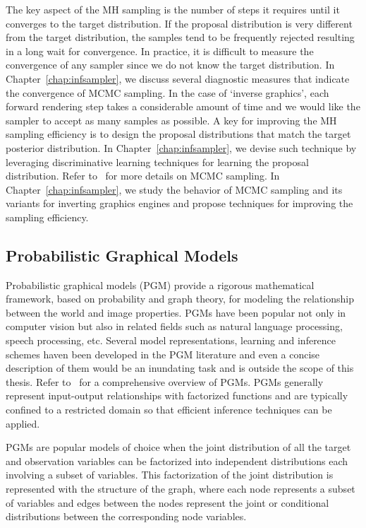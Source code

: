 The key aspect of the MH sampling is the number of steps it requires until
it converges to the target distribution. If the proposal distribution is very
different from the target distribution, the samples tend to be frequently rejected
resulting in a long wait for convergence. In practice, it is difficult to
measure the convergence of any sampler since we do not know the target
distribution. In Chapter~\ref{chap:infsampler}, we discuss several diagnostic
measures that indicate the convergence of MCMC sampling. In the case of
`inverse graphics', each forward rendering step takes a considerable amount of time and
we would like the sampler to accept as many samples as possible. A key for improving
the MH sampling efficiency is to design the proposal distributions that match
the target posterior distribution. In Chapter~\ref{chap:infsampler}, we devise
such technique by leveraging discriminative learning techniques for learning
the proposal distribution. Refer to~\cite{liu2001montecarlo,koller2009probabilistic}
for more details on MCMC sampling. In Chapter~\ref{chap:infsampler}, we study
the behavior of MCMC sampling and its variants for inverting graphics
engines and propose techniques for improving the sampling efficiency.

\subsection{Probabilistic Graphical Models}
\label{sec:pgm}

Probabilistic graphical models (PGM) provide a rigorous mathematical framework,
based on probability and graph theory, for modeling the relationship between
the world and image properties.
PGMs have been popular not only in computer vision but also in
related fields such as natural language processing,
speech processing, etc. Several model representations, learning and inference
schemes haven been developed in the PGM literature and even a concise description
of them would be an inundating task and is outside the scope of this thesis. Refer
to~\cite{koller2009probabilistic} for a comprehensive overview of PGMs.
PGMs generally represent input-output relationships with
factorized functions and are typically confined to a restricted domain so that
efficient inference techniques can be applied.

PGMs are popular models of choice when the joint distribution of all the target
and observation variables can be factorized into independent distributions
each involving a subset of variables. This factorization of the joint distribution
is represented with the structure of the graph, where each node represents a subset
of variables and edges between the nodes represent the joint or conditional
distributions between the corresponding node variables.

